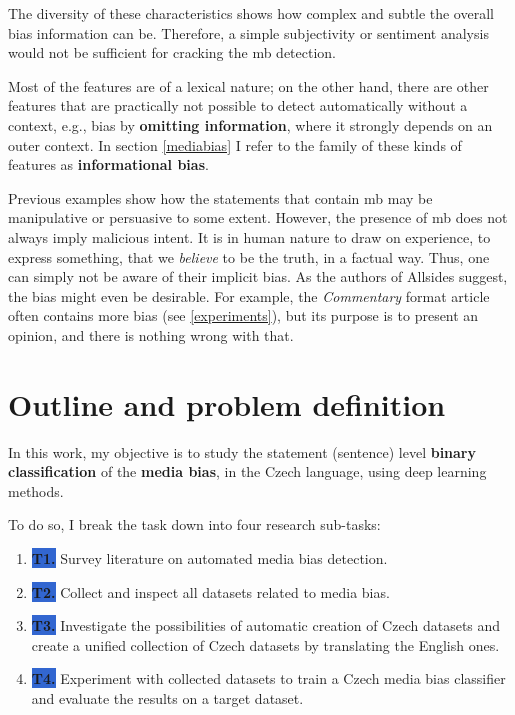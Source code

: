 The diversity of these characteristics shows how complex and subtle the overall bias information can be. Therefore, a simple subjectivity or sentiment analysis would not be sufficient for cracking the \gls{mb} detection. 

Most of the features are of a lexical nature; on the other hand, there are other features that are practically not possible to detect automatically without a context, e.g., bias by \textbf{omitting information}, where it strongly depends on an outer context. In section \ref{mediabias} I refer to the family of these kinds of features as \textbf{informational bias}.


Previous examples show how the statements that contain \gls{mb} may be manipulative or persuasive to some extent. However, the presence of \gls{mb} does not always imply malicious intent. It is in human nature to draw on experience, to express something, that we \textit{believe} to be the truth, in a factual way. Thus, one can simply not be aware of their implicit bias. As the authors of Allsides suggest, the bias might even be desirable. For example, the \textit{Commentary} format article often contains more bias (see \ref{experiments}), but its purpose is to present an opinion, and there is nothing wrong with that.


\newpage
\section{Outline and problem definition}\label{problem_definition}
In this work, my objective is to study the statement (sentence) level \textbf{binary classification} of the \textbf{media bias}, in the Czech language, using deep learning methods.

 To do so, I break the task down into four research sub-tasks:
 \begin{enumerate}
     \item[] \colorbox{highlight}{\textbf{T1.}\label{T1}} Survey literature on automated media bias detection.
     \item[] \colorbox{highlight}{\textbf{T2.}\label{T2}} Collect and inspect all datasets related to media bias.
     \item[] \colorbox{highlight}{\textbf{T3.}\label{T3}} Investigate the possibilities of automatic creation of Czech datasets and create a unified collection of Czech datasets by translating the English ones.
     \item[] \colorbox{highlight}{\textbf{T4.}\label{T4}} Experiment with collected datasets to train a Czech media bias classifier and evaluate the results on a target dataset.
 \end{enumerate}
 
